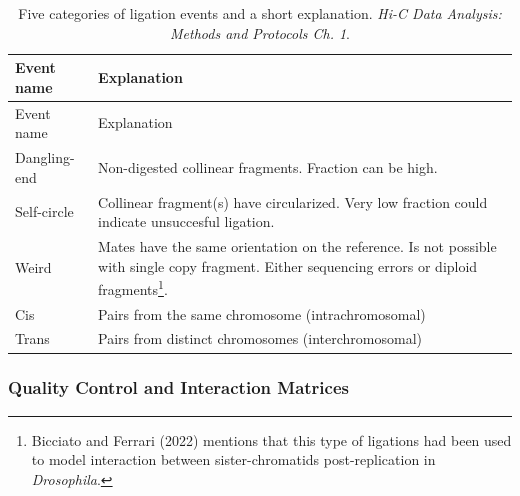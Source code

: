 \documentclass[
  11pt,
  a4paper,
]{scrbook}
\begin{document}
\begin{longtable}[]{@{}
  >{\raggedright\arraybackslash}p{}
  >{\raggedright\arraybackslash}p{}@{}}
\caption{Five categories of ligation events and a short explanation.
\emph{Hi-C Data Analysis: Methods and Protocols Ch.
1}.}\label{tbl-ligation-events}\tabularnewline
\toprule\noalign{}
\begin{minipage}[b]{\linewidth}\raggedright
Event name
\end{minipage} & \begin{minipage}[b]{\linewidth}\raggedright
Explanation
\end{minipage} \\
\midrule\noalign{}
\endfirsthead
\toprule\noalign{}
\begin{minipage}[b]{\linewidth}\raggedright
Event name
\end{minipage} & \begin{minipage}[b]{\linewidth}\raggedright
Explanation
\end{minipage} \\
\midrule\noalign{}
\endhead
\bottomrule\noalign{}
\endlastfoot
Dangling-end & Non-digested collinear fragments. Fraction can be
high. \\
Self-circle & Collinear fragment(s) have circularized. Very low fraction
could indicate unsuccesful ligation. \\
Weird & Mates have the same orientation on the reference. Is not
possible with single copy fragment. Either sequencing errors or diploid
fragments\footnote{Bicciato and Ferrari (2022) mentions that this type
  of ligations had been used to model interaction between
  sister-chromatids post-replication in \emph{Drosophila}.}. \\
Cis & Pairs from the same chromosome (intrachromosomal) \\
Trans & Pairs from distinct chromosomes (interchromosomal) \\
\end{longtable}

\subsubsection{Quality Control and Interaction
Matrices}\label{sec-matrix-qc}
\end{document}
